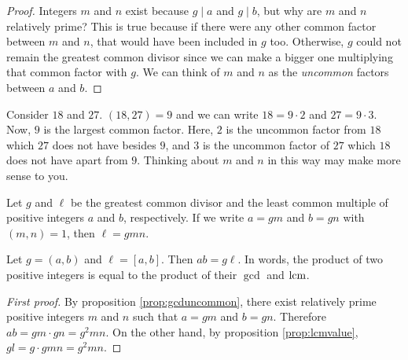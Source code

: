 \begin{proof}
	Integers $m$ and $n$ exist because $g\mid a$ and $g\mid b$, but why are $m$ and $n$ relatively prime? This is true because if there were any other common factor between $m$ and $n$, that would have been included in $g$ too. Otherwise, $g$ could not remain the greatest common divisor since we can make a bigger one multiplying that common factor with $g$. We can think of $m$ and $n$ as the \textit{uncommon} factors between $a$ and $b$.
\end{proof}

\begin{example}
	Consider $18$ and $27$. $(18,27)=9$ and we can write $18=9\cdot2$ and $27=9\cdot3$. Now, $9$ is the largest common factor. Here, $2$ is the uncommon factor from $18$ which $27$ does not have besides $9$, and $3$ is the uncommon factor of $27$ which $18$ does not have apart from $9$. Thinking about $m$ and $n$ in this way may make more sense to you.
\end{example}

\begin{proposition}\label{prop:lcmvalue}
	Let $g$ and $\ell$ be the greatest common divisor and the least common multiple of positive integers $a$ and $b$, respectively. If we write $a=gm$ and $b=gn$ with $(m,n)=1$, then $\ell=gmn$.
\end{proposition}

\begin{proposition}
	Let $g=(a,b)$ and $\ell = [a,b]$. Then $ab=g\ell$. In words, the product of two positive integers is equal to the product of their $\gcd$ and $\operatorname{lcm}$.
\end{proposition}


\begin{proof}[First proof]
	By proposition \eqref{prop:gcduncommon}, there exist relatively prime positive integers $m$ and $n$ such that $a=gm$ and $b=gn$. Therefore $ab=gm\cdot gn=g^2mn$. On the other hand, by proposition \eqref{prop:lcmvalue}, $gl=g\cdot gmn=g^2mn$.
\end{proof}

